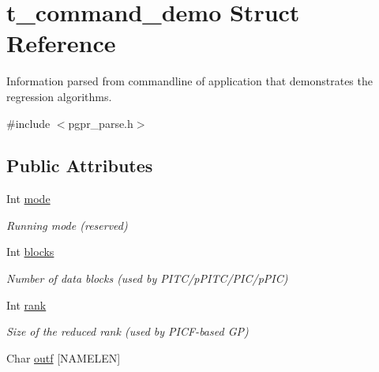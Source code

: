 \hypertarget{structt__command__demo}{\section{t\-\_\-command\-\_\-demo Struct Reference}
\label{structt__command__demo}
}


Information parsed from commandline of application that demonstrates the regression algorithms.  




{\ttfamily \#include $<$pgpr\-\_\-parse.\-h$>$}

\subsection*{Public Attributes}
\begin{DoxyCompactItemize}
\item 
\hypertarget{structt__command__demo_ac45fbb0d03acb8884ce904e82b82e5bc}{Int \hyperlink{structt__command__demo_ac45fbb0d03acb8884ce904e82b82e5bc}{mode}}\label{structt__command__demo_ac45fbb0d03acb8884ce904e82b82e5bc}

\begin{DoxyCompactList}\small\item\em Running mode (reserved) \end{DoxyCompactList}\item 
\hypertarget{structt__command__demo_a26890a40c95b0bcf54cc69b11f802dda}{Int \hyperlink{structt__command__demo_a26890a40c95b0bcf54cc69b11f802dda}{blocks}}\label{structt__command__demo_a26890a40c95b0bcf54cc69b11f802dda}

\begin{DoxyCompactList}\small\item\em Number of data blocks (used by P\-I\-T\-C/p\-P\-I\-T\-C/\-P\-I\-C/p\-P\-I\-C) \end{DoxyCompactList}\item 
\hypertarget{structt__command__demo_a287322538dd7b8f950eeedba17a9a590}{Int \hyperlink{structt__command__demo_a287322538dd7b8f950eeedba17a9a590}{rank}}\label{structt__command__demo_a287322538dd7b8f950eeedba17a9a590}

\begin{DoxyCompactList}\small\item\em Size of the reduced rank (used by P\-I\-C\-F-\/based G\-P) \end{DoxyCompactList}\item 
\hypertarget{structt__command__demo_a5243a68b75cfdcd0787feb1d1a24cdd9}{Char \hyperlink{structt__command__demo_a5243a68b75cfdcd0787feb1d1a24cdd9}{outf} \mbox{[}N\-A\-M\-E\-L\-E\-N\mbox{]}}\label{structt__command__demo_a5243a68b75cfdcd0787feb1d1a24cdd9}


\end{DoxyCompactItemize}
